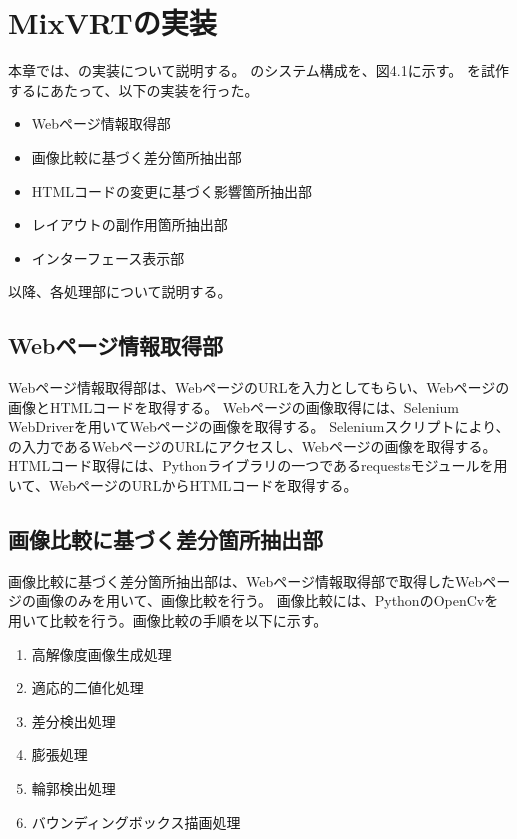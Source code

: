 \chapter{MixVRTの実装}\label{cha:Implementation}
本章では、\toolName の実装について説明する。
\toolName のシステム構成を、図4.1に示す。
\toolName を試作するにあたって、以下の実装を行った。
\begin{itemize}
    \item Webページ情報取得部
    \item 画像比較に基づく差分箇所抽出部
    \item HTMLコードの変更に基づく影響箇所抽出部
    \item レイアウトの副作用箇所抽出部
    \item インターフェース表示部
\end{itemize}
以降、各処理部について説明する。
\par



\section{Webページ情報取得部}\label{sec:Web_page_information_get_section}
Webページ情報取得部は、WebページのURLを入力としてもらい、Webページの画像とHTMLコードを取得する。
Webページの画像取得には、Selenium WebDriverを用いてWebページの画像を取得する。
Seleniumスクリプトにより、\toolName の入力であるWebページのURLにアクセスし、Webページの画像を取得する。
HTMLコード取得には、Pythonライブラリの一つであるrequestsモジュールを用いて、WebページのURLからHTMLコードを取得する。


\section{画像比較に基づく差分箇所抽出部}\label{sec:Difference_extraction_section}
画像比較に基づく差分箇所抽出部は、Webページ情報取得部で取得したWebページの画像のみを用いて、画像比較を行う。
画像比較には、PythonのOpenCvを用いて比較を行う。画像比較の手順を以下に示す。
\begin{enumerate}
    \item 高解像度画像生成処理
    \item 適応的二値化処理
    \item 差分検出処理
    \item 膨張処理
    \item 輪郭検出処理
    \item バウンディングボックス描画処理
\end{enumerate}

